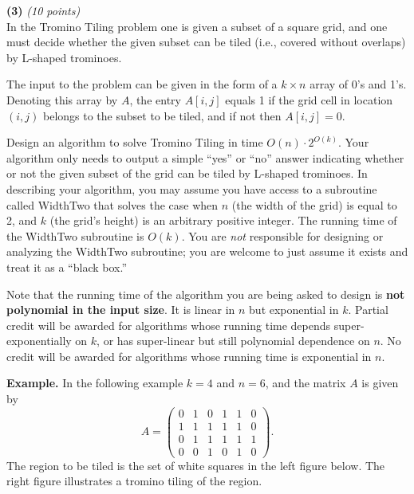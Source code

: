 \documentclass[12pt]{article}
\begin{document}
\setlength{\parindent}{0in}
\addtolength{\parskip}{0.1cm}
\setlength{\fboxrule}{.5mm}\setlength{\fboxsep}{1.2mm}
\newlength{\boxlength}\setlength{\boxlength}{\textwidth}
\addtolength{\boxlength}{-4mm}
\begin{center}
\end{center}
\vspace{5mm}

{\bf (3)} {\em (10 points)} \\
In the {\sc Tromino Tiling} problem one is given
a subset of a square grid, and one must decide 
whether the given subset can be tiled (i.e., 
covered without overlaps) by L-shaped trominoes.

The input to the problem can be given in the form 
of a $k \times n$ array of 0's and 1's. 
Denoting this array by $A$, the
entry $A[i,j]$ equals 1 if the grid cell in 
location $(i,j)$ belongs to the subset to be tiled, 
and if not then $A[i,j]=0$.

Design an algorithm to solve {\sc Tromino Tiling}
in time $O(n) \cdot 2^{O(k)}$.
Your algorithm only needs to output a simple ``yes''
or ``no'' answer indicating whether or not
the given subset of the grid can be tiled by 
L-shaped trominoes. In describing your algorithm, 
you may assume you have access to a subroutine
called {\sc WidthTwo} that solves the case when
$n$ (the width of the grid) is equal to 2, and 
$k$ (the grid's height) is an arbitrary positive
integer. The running time of the {\sc WidthTwo} 
subroutine is $O(k)$. You are \emph{not} responsible for
designing or analyzing the {\sc WidthTwo} 
subroutine; you are welcome to just assume it
exists and treat it as a ``black box.'' 

Note that the running time of the algorithm 
you are being asked to design is {\bf not 
polynomial in the input size}. It is linear
in $n$ but exponential in $k$. Partial credit
will be awarded for algorithms 
whose running time depends 
super-exponentially on $k$, or has
super-linear but still polynomial
dependence on $n$. No credit will be awarded
for algorithms whose running time is 
exponential in $n$. 

{\bf Example.} In the following example
$k=4$ and $n=6$, and the matrix $A$ is
given by
\[
  A = \begin{pmatrix}
    0 & 1 & 0 & 1 & 1 & 0 \\
    1 & 1 & 1 & 1 & 1 & 0 \\
    0 & 1 & 1 & 1 & 1 & 1 \\
    0 & 0 & 1 & 0 & 1 & 0 
  \end{pmatrix} .
\]
The region to be tiled
is the set of white squares in the left
figure below. The right figure illustrates
a tromino tiling of the region.
\end{document}
